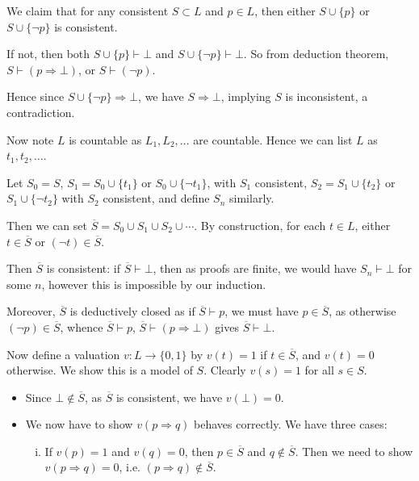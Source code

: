 \documentclass[12pt]{article}
\begin{document}
\begin{proofbox}
	We claim that for any consistent $S \subset L$ and $p \in L$, then either $S \cup \{p\}$ or $S \cup \{\neg p\}$ is consistent.

	If not, then both $S \cup \{p\} \vdash \bot$ and $S \cup \{\neg p\} \vdash \bot$. So from deduction theorem, $S \vdash (p \Rightarrow \bot)$, or $S \vdash (\neg p)$.

	Hence since $S \cup\{\neg p\} \Rightarrow \bot$, we have $S \Rightarrow \bot$, implying $S$ is inconsistent, a contradiction.

	Now note $L$ is countable as $L_1, L_2, \ldots$ are countable. Hence we can list $L$ as $t_1, t_2, \ldots$.

	Let $S_0 = S$, $S_1 = S_0 \cup \{t_1\}$ or $S_0 \cup \{\neg t_1\}$, with $S_1$ consistent, $S_2 = S_1 \cup \{t_2\}$ or $S_1 \cup \{\neg t_2\}$ with $S_2$ consistent, and define $S_n$ similarly.

	Then we can set $\overline{S} = S_0 \cup S_1 \cup S_2 \cup \cdots$. By construction, for each $t \in L$, either $t \in \overline{S}$ or $(\neg t) \in \overline{S}$.

	Then $\overline{S}$ is consistent: if $\overline{S} \vdash \bot$, then as proofs are finite, we would have $S_n \vdash \bot$ for some $n$, however this is impossible by our induction.

	Moreover, $\overline{S}$ is deductively closed as if $\overline{S} \vdash p$, we must have $p \in \overline{S}$, as otherwise $(\neg p) \in \overline{S}$, whence $\overline{S} \vdash p$, $\overline{S} \vdash (p \Rightarrow \bot)$ gives $\overline{S} \vdash \bot$.

	Now define a valuation $v : L \to \{0,1\}$ by $v(t) = 1$ if $t \in \overline{S}$, and $v(t) = 0$ otherwise. We show this is a model of $S$. Clearly $v(s) = 1$ for all $s \in S$.

	\begin{itemize}
		\item Since $\bot \not \in \overline{S}$, as $\overline{S}$ is consistent, we have $v(\bot) = 0$.
		\item We now have to show $v(p \Rightarrow q)$ behaves correctly. We have three cases:
			\begin{enumerate}[(i)]
				\item If $v(p) = 1$ and $v(q) = 0$, then $p \in \overline{S}$ and $q \not \in \overline{S}$. Then we need to show $v(p \Rightarrow q) = 0$, i.e. $(p \Rightarrow q) \not \in \overline{S}$.


\end{enumerate}
\end{itemize}
\end{proofbox}
\end{document}
